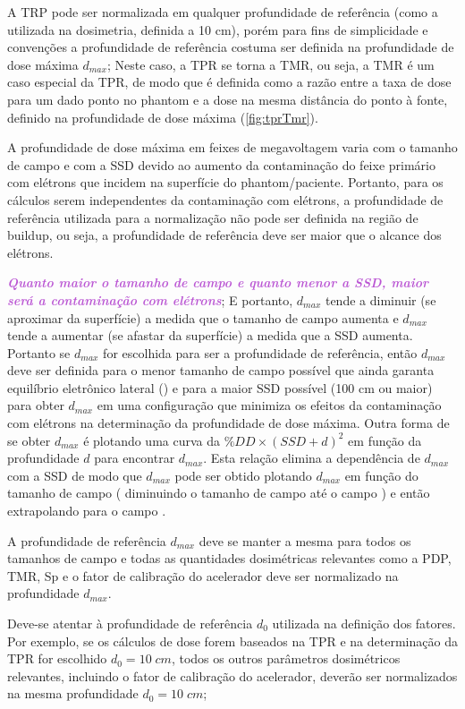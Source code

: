 \documentclass[11pt,a4paper]{article}
\newcounter{exemplo}
\begin{document}
    A TRP pode ser normalizada em qualquer profundidade de referência (como a utilizada na dosimetria, definida a 10 cm), porém para fins de simplicidade e convenções a profundidade de referência costuma ser definida na profundidade de dose máxima $d_{max}$; Neste caso, a TPR se torna a TMR, ou seja, a TMR é um caso especial da TPR, de modo que é definida como a razão entre a taxa de dose para um dado ponto no phantom e a dose na mesma distância do ponto à fonte, definido na profundidade de dose máxima (\ref{fig:tprTmr}). 
    
    A profundidade de dose máxima em feixes de megavoltagem varia com o tamanho de campo e com a SSD devido ao aumento da contaminação do feixe primário com elétrons que incidem na superfície do phantom/paciente. Portanto, para os cálculos serem independentes da contaminação com elétrons, a profundidade de referência utilizada para a normalização não pode ser definida na região de buildup, ou seja, a profundidade de referência deve ser maior que o alcance dos elétrons. 

    \textcolor{MediumOrchid}{\textbf{\textit{Quanto maior o tamanho de campo e quanto menor a SSD, maior será a contaminação com elétrons}}}; E portanto, $d_{max}$ tende a diminuir (se aproximar da superfície) a medida que o tamanho de campo aumenta e $d_{max}$ tende a aumentar (se afastar da superfície) a medida que a SSD aumenta. Portanto se $d_{max}$ for escolhida para ser a profundidade de referência, então $d_{max}$ deve ser definida para o menor tamanho de campo possível que ainda garanta equilíbrio eletrônico lateral () e para a maior SSD possível (100 cm ou maior) para obter $d_{max}$ em uma configuração que minimiza os efeitos da contaminação com elétrons na determinação da profundidade de dose máxima. Outra forma de se obter $d_{max}$ é plotando uma curva da $\%DD \times (SSD + d)^2$ em função da profundidade $d$ para encontrar $d_{max}$. Esta relação elimina a dependência de $d_{max}$ com a SSD de modo que $d_{max}$ pode ser obtido plotando $d_{max}$ em função do tamanho de campo ( diminuindo o tamanho de campo até o campo  ) e então extrapolando para o campo .

    A profundidade de referência $d_{max}$ deve se manter a mesma para todos os tamanhos de campo e todas as quantidades dosimétricas relevantes como a PDP, TMR, Sp e o fator de calibração do acelerador deve ser normalizado na profundidade $d_{max}$. 


    \begin{tcolorbox}[width=\textwidth, colback={white}, colbacktitle={DarkTurquoise!50!white}, title={$\bigstar$ \LobsterTwo{Observação} $\bigstar $}, coltitle={CarnationPink}, colframe={DarkTurquoise}, fonttitle=\rmfamily\bfseries\Large]
        Deve-se atentar à profundidade de referência $d_0$ utilizada na definição dos fatores. Por exemplo, se os cálculos de dose forem baseados na TPR e na determinação da TPR for escolhido $d_0 = 10 \; cm$, todos os outros parâmetros dosimétricos relevantes, incluindo o fator de calibração do acelerador, deverão ser normalizados na mesma profundidade $d_0 = 10\; cm$;
    \end{tcolorbox}
\end{document}
